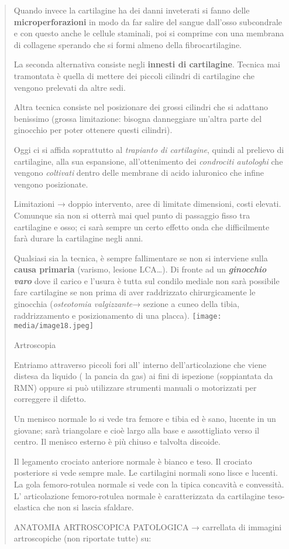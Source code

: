 \documentclass[]{article}
\begin{document}
\begin{quote}
Quando invece la cartilagine ha dei danni inveterati si fanno delle
\textbf{microperforazioni} in modo da far salire del sangue dall'osso
subcondrale e con questo anche le cellule staminali, poi si comprime con
una membrana di collagene sperando che si formi almeno della
fibrocartilagine.

La seconda alternativa consiste negli \textbf{innesti di cartilagine}.
Tecnica mai tramontata è quella di mettere dei piccoli cilindri di
cartilagine che vengono prelevati da altre sedi.

Altra tecnica consiste nel posizionare dei grossi cilindri che si
adattano benissimo (grossa limitazione: bisogna danneggiare un'altra
parte del ginocchio per poter ottenere questi cilindri).

Oggi ci si affida soprattutto al \emph{trapianto di cartilagine}, quindi
al prelievo di cartilagine, alla sua espansione, all'ottenimento dei
\emph{condrociti autologhi} che vengono \emph{coltivati} dentro delle
membrane di acido ialuronico che infine vengono posizionate.

Limitazioni → doppio intervento, aree di limitate dimensioni, costi
elevati. Comunque sia non si otterrà mai quel punto di passaggio fisso
tra cartilagine e osso; ci sarà sempre un certo effetto onda che
difficilmente farà durare la cartilagine negli anni.

Qualsiasi sia la tecnica, è sempre fallimentare se non si interviene
sulla \textbf{causa primaria} (varismo, lesione LCA\ldots{}). Di fronte
ad un \emph{\textbf{ginocchio varo}} dove il carico e l'usura è tutta
sul condilo mediale non sarà possibile fare cartilagine se non prima di
aver raddrizzato chirurgicamente le ginocchia (\emph{osteotomia
valgizzante}→ sezione a cuneo della tibia, raddrizzamento e
posizionamento di una placca).
\texttt{[image: media/image18.jpeg]}

Artroscopia

Entriamo attraverso piccoli fori all' interno dell'articolazione che
viene distesa da liquido ( la pancia da gas) ai fini di ispezione
(soppiantata da RMN) oppure si può utilizzare strumenti manuali o
motorizzati per correggere il difetto.

Un menisco normale lo si vede tra femore e tibia ed è sano, lucente in
un giovane; sarà triangolare e cioè largo alla base e assottigliato
verso il centro. Il menisco esterno è più chiuso e talvolta discoide.

Il legamento crociato anteriore normale è bianco e teso. Il crociato
posteriore si vede sempre male. Le cartilagini normali sono lisce e
lucenti. La gola femoro-rotulea normale si vede con la tipica concavità
e convessità. L' articolazione femoro-rotulea normale è caratterizzata
da cartilagine teso-elastica che non si lascia sfaldare.

ANATOMIA ARTROSCOPICA PATOLOGICA → carrellata di immagini artroscopiche
(non riportate tutte) su:
\end{quote}
\end{document}
